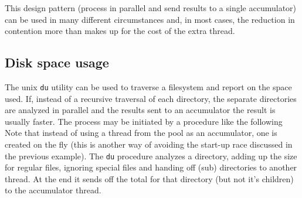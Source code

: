 This design pattern (process in parallel and send results to a single
accumulator) can be used in many different circumstances and, in most cases, the
reduction in contention more than makes up for the cost of the extra
thread. 

\bigskip

\subsection{Disk space usage}
The unix \texttt{du} utility can be used to traverse a filesystem and report on
the space used.  If, instead of a recursive traversal of each directory, the
separate directories are analyzed in parallel and the results sent to an
accumulator the result is usually faster. The process may be initiated by a
procedure like the following
{\small
{}
}
Note that instead of using a thread from the pool as an accumulator, one is
created on the fly (this is another way of avoiding the start-up race discussed
in the previous example). The \texttt{du} procedure analyzes a directory, adding
up the size for regular files, ignoring special files and handing off (sub)
directories to another thread. At the end it sends off the total for that
directory (but not it's children) to the accumulator thread.

